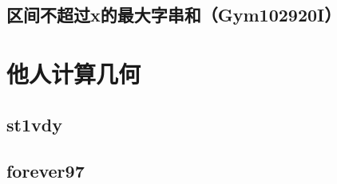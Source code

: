 \documentclass[twoside,a4paper]{article}
\begin{document}
\subsection{区间不超过x的最大字串和（Gym102920I）}


\section{他人计算几何}
\subsection{st1vdy}

\subsection{forever97}

\end{document}
